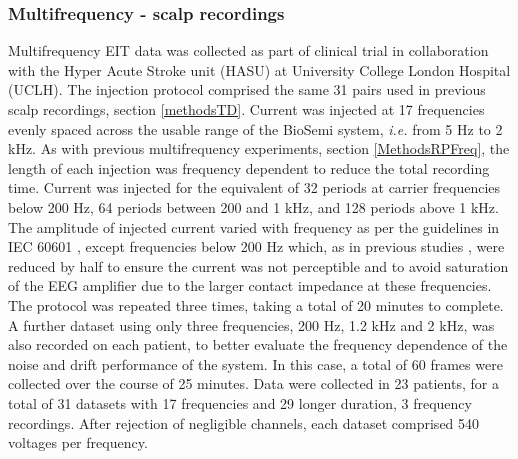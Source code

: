 \subsubsection{Multifrequency - scalp recordings}

Multifrequency EIT data was collected as part of clinical trial in collaboration with the Hyper Acute Stroke unit (HASU) at University College London Hospital (UCLH). The injection protocol comprised the same 31 pairs used in previous scalp recordings, section \ref{methodsTD}.  Current was injected at 17 frequencies evenly spaced across the usable range of the BioSemi system, \emph{i.e.} from 5 Hz to 2 kHz. As with previous multifrequency experiments, section \ref{MethodsRPFreq}, the length of each injection was frequency dependent to reduce the total recording time. Current was injected for the equivalent of 32 periods at carrier frequencies below 200 Hz, 64 periods between 200 and 1 kHz, and 128 periods above 1 kHz. The amplitude of injected current varied with frequency as per the guidelines in IEC 60601 \cite{IEC}, except frequencies below 200 Hz which, as in previous studies \cite{McEwan_2006}, were reduced by half to ensure the current was not perceptible and to avoid saturation of the EEG amplifier due to the larger contact impedance at these frequencies. The protocol was repeated three times, taking a total of 20 minutes to complete. A further dataset using only three frequencies, 200 Hz, 1.2 kHz and 2 kHz, was also recorded on each patient, to better evaluate the frequency dependence of the noise and drift performance of the system. In this case, a total of 60 frames were collected over the course of 25 minutes. Data were collected in 23 patients, for a total of 31 datasets with 17 frequencies and 29 longer duration, 3 frequency recordings. After rejection of negligible channels, each dataset comprised 540 voltages per frequency.  
